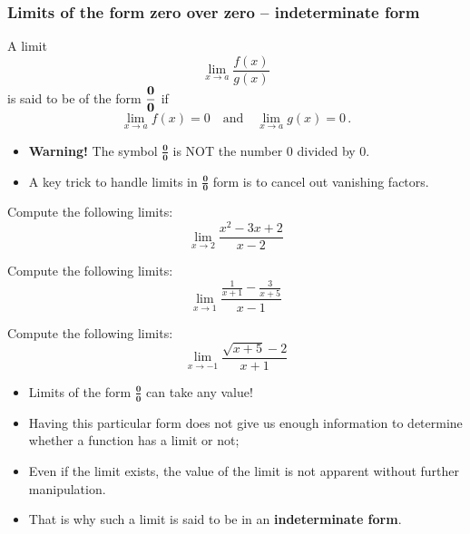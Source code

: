 \documentclass[10pt,t,presentation,ignorenonframetext,aspectratio=169]{beamer}
\title[\course]{\lecTitle}
\institute[Ohio State]
{
  \medskip
}
\date[\week]{\semester}
\author{Tae Eun Kim, Ph.D.}
\newcommand{\zoz}{$\mathbf{ \frac{0}{0} }$}
\begin{document}
\begin{frame}
  \titlepage
\end{frame}


\begin{frame}
  \frametitle{Limits of the form zero over zero -- indeterminate form}
  \begin{defn}
    A limit
    \[
      \lim_{x \to a} \frac{f(x)}{g(x)}
    \]
    is said to be of the form $\displaystyle \mathbf{ \frac{0}{0} }$ if
    \[
      \lim_{x \to a} f(x) = 0
      \quad \text{and} \quad
      \lim_{x \to a} g(x) = 0 \,.
    \]
  \end{defn}

  \begin{itemize}
  \item \textbf{Warning!} The symbol \zoz{} is NOT the number 0 divided by 0.
  \item A key trick to handle limits in \zoz{} form is to
    cancel out vanishing factors.
  \end{itemize}
\end{frame}

\begin{frame}
  \vs
  \question{} Compute the following limits:
  \[
    \lim_{x \to 2} \frac{ x^2-3x+2 }{ x-2 }
  \]
\end{frame}

\begin{frame}
  \vs
  \question{} Compute the following limits:
  \[
    \lim_{x \to 1} \frac{ \frac{1}{x+1} - \frac{3}{x+5} }{ x-1 }
  \]
\end{frame}

\begin{frame}
  \vs
  \question{} Compute the following limits:
  \[
    \lim_{x \to -1} \frac{ \sqrt{x+5}-2 }{ x+1 }
  \]
\end{frame}

\begin{frame}
  \vs
  \begin{rmk}
    \begin{itemize}
    \item Limits of the form \zoz{} can take any value!
    \item Having this particular form does not give us enough information to determine
      whether a function has a limit or not;
    \item Even if the limit exists, the value of the limit is not apparent
      without further manipulation.
    \item That is why such a limit is said to be in an \textbf{indeterminate form}.
    \end{itemize}
  \end{rmk}
\end{frame}
\end{document}

